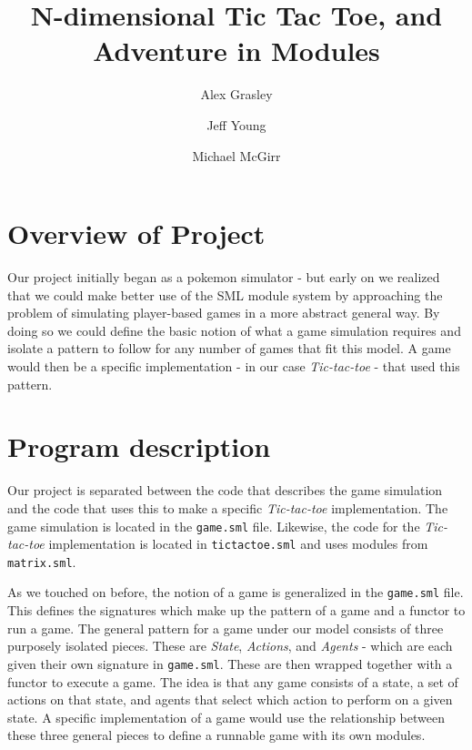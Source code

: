 \documentclass[9pt,letterpaper]{extarticle}
\title{N-dimensional Tic Tac Toe, and Adventure in Modules}
\author{Alex Grasley \and Jeff Young \and Michael McGirr}
\date{}
\begin{document}
	\maketitle

  \section{Overview of Project}

  Our project initially began as a pokemon simulator - but early on we realized
  that we could make better use of the SML module system by approaching the
  problem of simulating player-based games in a more abstract general way.
  By doing so we could define the basic notion of what a game simulation requires
  and isolate a pattern to follow for any number of games that fit this
  model.
  A game would then be a specific implementation - in our case
  \textit{Tic-tac-toe} - that used this pattern.

  \section{Program description}
  
  Our project is separated between the code that describes the game simulation
  and the code that uses this to make a specific \textit{Tic-tac-toe} implementation.
  The game simulation is located in the \texttt{game.sml} file. Likewise, the
  code for the \textit{Tic-tac-toe} implementation is located in
  \texttt{tictactoe.sml} and uses modules from \texttt{matrix.sml}.

  As we touched on before, the notion of a game is generalized in the
  \texttt{game.sml} file. This defines the signatures which make up the pattern
  of a game and a functor to run a game.
  The general pattern for a game under our model consists of three purposely
  isolated pieces.
  These are \textit{State}, \textit{Actions}, and \textit{Agents} - which are
  each given their own signature in \texttt{game.sml}.
  These are then wrapped together with a functor to execute a game.
  The idea is that any game consists of a state, a set of actions on that state,
  and agents that select which action to perform on a given state. A specific implementation of a
  game would use the relationship between these three general pieces to define
  a runnable game with its own modules.
\end{document}
